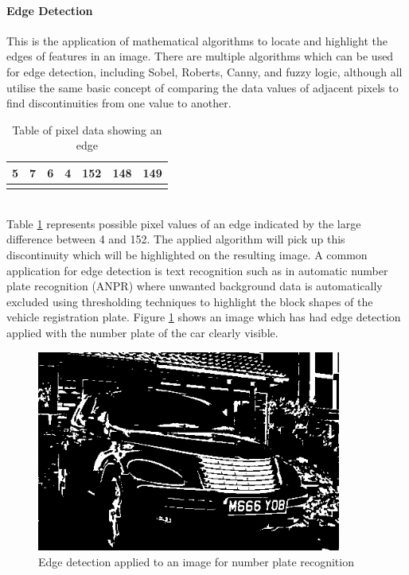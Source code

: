 	\paragraph{Edge Detection}
	This is the application of mathematical algorithms to locate and highlight the edges of features in an image. There are multiple algorithms which can be used for edge detection, including Sobel, Roberts, Canny, and fuzzy logic, although all utilise the same basic concept of comparing the data values of adjacent pixels to find discontinuities from one value to another.
	\begin{table}[h!]
		\centering
		\caption{Table of pixel data showing an edge}
		\label{tab:edgePixels}
		\begin{tabular}{|c|c|c|c|c|c|c|}
			\hline
			5&7&6&4&152&148&149\\
			\hline
			\cellcolor[HTML]{0D0D0D}&
			\cellcolor[HTML]{121212}&
			\cellcolor[HTML]{0F0F0F}&
			\cellcolor[HTML]{0a0a0a}&
			\cellcolor[HTML]{989898}&
			\cellcolor[HTML]{949494}&
			\cellcolor[HTML]{959595}\\
			\hline
		\end{tabular}
	\end{table}\\
	Table \ref{tab:edgePixels} represents possible pixel values of an edge indicated by the large difference between 4 and 152. The applied algorithm will pick up this discontinuity which will be highlighted on the resulting image. A common application for edge detection is text recognition such as in automatic number plate recognition (ANPR) \citep{anpr} where unwanted background data is automatically excluded using thresholding techniques to highlight the block shapes of the vehicle registration plate. Figure \ref{fig:anpr} shows an image which has had edge detection applied with the number plate of the car clearly visible.
	\begin{figure}[h!]
		\centering
		\includegraphics[width=10cm]{../images/anpr.jpg}
		\caption{Edge detection applied to an image for number plate recognition}
		\label{fig:anpr}
	\end{figure} 
